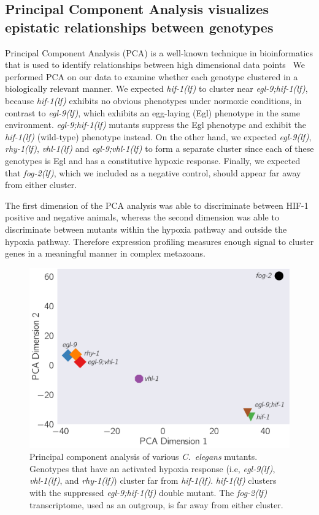 \documentclass[9pt,twocolumn,twoside]{pnas-new}
\newcommand{\cel}{\emph{C.~elegans}}
\newcommand{\fog}{\emph{fog-2(lf)}}
\newcommand{\egl}{\emph{egl-9(lf)}}
\newcommand{\rhy}{\emph{rhy-1(lf)}}
\newcommand{\vhl}{\emph{vhl-1(lf)}}
\newcommand{\eglvhl}{\emph{egl-9;vhl-1(lf)}}
\newcommand{\eglhif}{\emph{egl-9;hif-1(lf)}}
\newcommand{\hif}{\emph{hif-1(lf)}}
\newcommand{\hifp}{HIF-1}
\begin{document}
\subsection*{Principal Component Analysis visualizes epistatic relationships between genotypes}
\label{sub:Clustering}

Principal Component Analysis (PCA) is a well-known technique in bioinformatics that is
used to identify relationships between high dimensional data points~\cite{Yeung2001}
We performed PCA on our data to examine whether each genotype clustered in a biologically
relevant manner. We expected \hif{} to cluster near \eglhif{}, because
\hif{} exhibits no obvious phenotypes under normoxic conditions, in contrast to
\egl{}, which exhibits an egg-laying (Egl) phenotype in the same environment.
\eglhif{} mutants suppress the Egl phenotype and exhibit the \hif{} (wild-type) phenotype
instead. On the other hand, we expected \egl{}, \rhy{}, \vhl{} and \eglvhl{} to
form a separate cluster since each of these genotypes is Egl and has a constitutive
hypoxic response. Finally, we expected that \fog{}, which we included as a negative
control, should appear far away from either cluster.

The first dimension of the PCA analysis was able to discriminate between \hifp{}
positive and negative animals, whereas the second dimension was able to discriminate
between mutants within the hypoxia pathway and outside the hypoxia pathway.
Therefore expression profiling measures enough signal to cluster genes in a
meaningful manner in complex metazoans.

\begin{figure}%
\centering
\includegraphics[width=0.75\linewidth]{figs/pca.pdf}
\caption{
Principal component analysis of various \cel{} mutants. Genotypes that have an
activated hypoxia response (i.e, \egl{}, \vhl{}, and \rhy{}) cluster far
from \hif{}. \hif{} clusters with the suppressed \eglhif{} double mutant.
The \fog{} transcriptome, used as an outgroup, is far away from either cluster.
}
\label{fig:dendrogram}
\end{figure}
\end{document}
